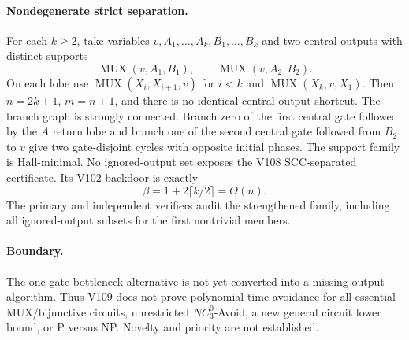 \documentclass[11pt]{article}
\begin{document}
\paragraph{Nondegenerate strict separation.}
For each $k\ge2$, take variables $v,A_1,\ldots,A_k,B_1,\ldots,B_k$ and two
central outputs with distinct supports
\[
 \operatorname{MUX}(v,A_1,B_1),\qquad
 \operatorname{MUX}(v,A_2,B_2).
\]
On each lobe use $\operatorname{MUX}(X_i,X_{i+1},v)$ for $i<k$ and
$\operatorname{MUX}(X_k,v,X_1)$.  Then $n=2k+1$, $m=n+1$, and there is no
identical-central-output shortcut.  The branch graph is strongly connected.
Branch zero of the first central gate followed by the $A$ return lobe and branch
one of the second central gate followed from $B_2$ to $v$ give two gate-disjoint
cycles with opposite initial phases.  The support family is Hall-minimal.  No
ignored-output set exposes the V108 SCC-separated certificate.  Its V102
backdoor is exactly
\[
 \beta=1+2\lceil k/2\rceil=\Theta(n).
\]
The primary and independent verifiers audit the strengthened family, including
all ignored-output subsets for the first nontrivial members.

\paragraph{Boundary.}
The one-gate bottleneck alternative is not yet converted into a missing-output
algorithm.  Thus V109 does not prove polynomial-time avoidance for all essential
MUX/bijunctive circuits, unrestricted $NC^0_3$-Avoid, a new general circuit lower
bound, or P versus NP.  Novelty and priority are not established.
\end{document}
